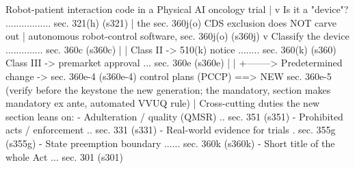 \begin{asciifig}
  Robot-patient interaction code in a Physical AI oncology trial
        |
        v
  Is it a "device"?  .................  sec. 321(h)          (s321)
        |  the sec. 360j(o) CDS exclusion does NOT carve out
        |  autonomous robot-control software, sec. 360j(o)  (s360j)
        v
  Classify the device  ..............   sec. 360c           (s360c)
        |                                  |
  Class II -> 510(k) notice  ........   sec. 360(k)         (s360)
  Class III -> premarket approval ...   sec. 360e           (s360e)
        |                                  |
        +--------> Predetermined change -> sec. 360e-4       (s360e-4)
                   control plans (PCCP) ==> NEW sec. 360e-5  (verify before
                   the keystone the new          generation; the mandatory,
                   section makes mandatory       ex ante, automated VVUQ rule)
        |
  Cross-cutting duties the new section leans on:
   - Adulteration / quality (QMSR)  ..   sec. 351            (s351)
   - Prohibited acts / enforcement  ..   sec. 331            (s331)
   - Real-world evidence for trials  .   sec. 355g           (s355g)
   - State preemption boundary  ......   sec. 360k           (s360k)
   - Short title of the whole Act  ...   sec. 301            (s301)
\end{asciifig}

